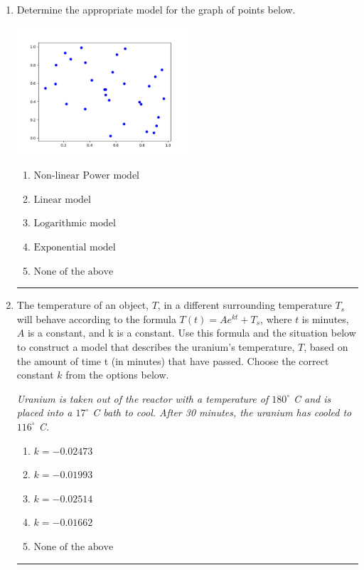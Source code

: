 \documentclass[14pt]{extbook}
\newcommand{\litem}[1]{\item#1\hspace*{-1cm}\rule{\textwidth}{0.4pt}}
\begin{document}
\begin{enumerate}
{\begin{enumerate}[label=\Alph*.]
\end{enumerate} }
\litem{
Determine the appropriate model for the graph of points below.
\begin{center}
    \includegraphics[width=0.5\textwidth]{../Figures/identifyModelGraph12C.png}
\end{center}
\begin{enumerate}[label=\Alph*.]
\item \( \text{Non-linear Power model} \)
\item \( \text{Linear model} \)
\item \( \text{Logarithmic model} \)
\item \( \text{Exponential model} \)
\item \( \text{None of the above} \)

\end{enumerate} }
\litem{
The temperature of an object, $T$, in a different surrounding temperature $T_s$ will behave according to the formula $T(t) = Ae^{kt} + T_s$, where $t$ is minutes, $A$ is a constant, and k is a constant. Use this formula and the situation below to construct a model that describes the uranium's temperature, $T$, based on the amount of time t (in minutes) that have passed. Choose the correct constant $k$ from the options below.
\begin{center}
    \textit{ Uranium is taken out of the reactor with a temperature of $180^{\circ}$ C and is placed into a $17^{\circ}$ C bath to cool. After 30 minutes, the uranium has cooled to $116^{\circ}$ C. }
\end{center}
\begin{enumerate}[label=\Alph*.]
\item \( k = -0.02473 \)
\item \( k = -0.01993 \)
\item \( k = -0.02514 \)
\item \( k = -0.01662 \)
\item \( \text{None of the above} \)


\end{enumerate}}
\end{enumerate}
\end{document}
